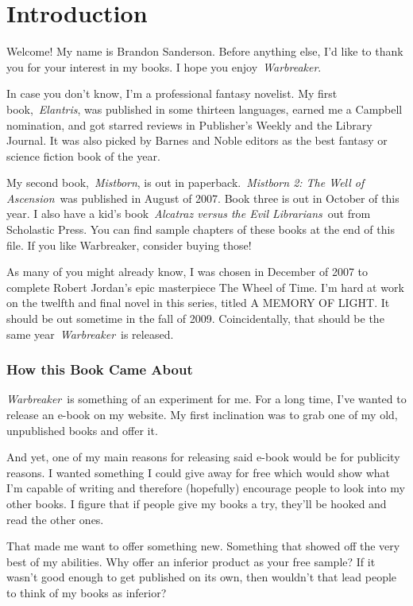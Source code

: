 \chapter{Introduction}

Welcome! My name is Brandon Sanderson. Before anything else, I’d like to thank you for your interest in my books. I hope you enjoy~\textit{Warbreaker}.

In case you don’t know, I’m a professional fantasy novelist. My first book,~\textit{Elantris}, was published in some thirteen languages, earned me a Campbell nomination, and got starred reviews in Publisher’s Weekly and the Library Journal. It was also picked by Barnes and Noble editors as the best fantasy or science fiction book of the year.

My second book,~\textit{Mistborn}, is out in paperback.~\textit{Mistborn 2: The Well of Ascension}~was published in August of 2007. Book three is out in October of this year. I also have a kid’s book~\textit{Alcatraz versus the Evil Librarians}~out from Scholastic Press. You can find sample chapters of these books at the end of this file. If you like Warbreaker, consider buying those!

As many of you might already know, I was chosen in December of 2007 to complete Robert Jordan’s epic masterpiece The Wheel of Time. I’m hard at work on the twelfth and final novel in this series, titled A MEMORY OF LIGHT. It should be out sometime in the fall of 2009. Coincidentally, that should be the same year~\textit{Warbreaker}~is released.

\subsection*{How this Book Came About}

\textit{Warbreaker}~is something of an experiment for me. For a long time, I’ve wanted to release an e-book on my website. My first inclination was to grab one of my old, unpublished books and offer it.

And yet, one of my main reasons for releasing said e-book would be for publicity reasons. I wanted something I could give away for free which would show what I’m capable of writing and therefore (hopefully) encourage people to look into my other books. I figure that if people give my books a try, they’ll be hooked and read the other ones.

That made me want to offer something new. Something that showed off the very best of my abilities. Why offer an inferior product as your free sample? If it wasn’t good enough to get published on its own, then wouldn’t that lead people to think of my books as inferior?

